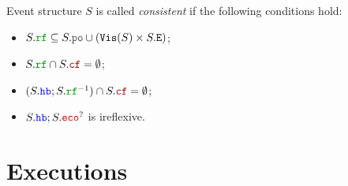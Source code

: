 \documentclass[12pt]{article}
\begin{document}
\begin{definition}
  Event structure $S$ is called \emph{consistent} if the following conditions hold:
  
  \begin{itemize}

    \item $S.\lRF \subseteq S.\lPO \cup (\lVIS(S) \times S.\lE)$;

    \item $S.\lRF \cap S.\lCF = \emptyset$;

    \item $(S.\lHB;S.\lRF^{-1}) \cap S.\lCF = \emptyset$;

    \item $S.\lHB;S.\lECO^?$ is ireflexive.
  \end{itemize}
\end{definition}

\section{Executions}
\end{document}
